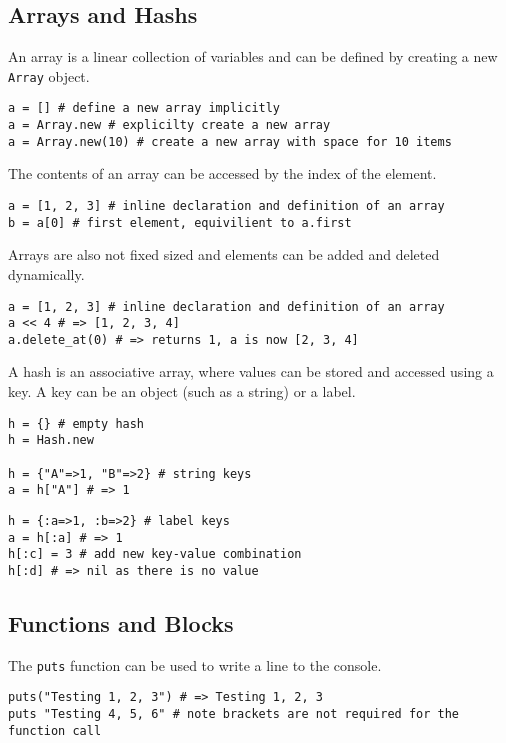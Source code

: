 \subsection{Arrays and Hashs}
An array is a linear collection of variables and can be defined by creating a new \texttt{Array} object.

\begin{lstlisting}
a = [] # define a new array implicitly
a = Array.new # explicilty create a new array
a = Array.new(10) # create a new array with space for 10 items
\end{lstlisting}

The contents of an array can be accessed by the index of the element. 

\begin{lstlisting}
a = [1, 2, 3] # inline declaration and definition of an array
b = a[0] # first element, equivilient to a.first
\end{lstlisting}

Arrays are also not fixed sized and elements can be added and deleted dynamically.
\begin{lstlisting}
a = [1, 2, 3] # inline declaration and definition of an array
a << 4 # => [1, 2, 3, 4]
a.delete_at(0) # => returns 1, a is now [2, 3, 4]
\end{lstlisting}

A hash is an associative array, where values can be stored and accessed using a key. A key can be an object (such as a string) or a label. 

\begin{lstlisting}
h = {} # empty hash
h = Hash.new

h = {"A"=>1, "B"=>2} # string keys 
a = h["A"] # => 1
\end{lstlisting}

\begin{lstlisting}
h = {:a=>1, :b=>2} # label keys 
a = h[:a] # => 1
h[:c] = 3 # add new key-value combination
h[:d] # => nil as there is no value
\end{lstlisting}

\subsection{Functions and Blocks}
The \texttt{puts} function can be used to write a line to the console.

\begin{lstlisting}
puts("Testing 1, 2, 3") # => Testing 1, 2, 3
puts "Testing 4, 5, 6" # note brackets are not required for the function call
\end{lstlisting}

